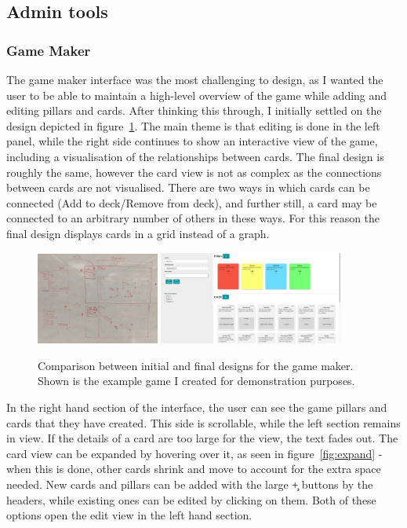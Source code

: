 \subsection{Admin tools}

\subsubsection{Game Maker}
The game maker interface was the most challenging to design, as I wanted the user to be able to maintain a high-level overview of the game while adding and editing pillars and cards.
After thinking this through, I initially settled on the design depicted in figure~\ref{fig:game_maker}. The main theme is that editing is done in the left panel, while the right side continues to show an interactive view of the game, including a visualisation of the relationships between cards.
The final design is roughly the same, however the card view is not as complex as the connections between cards are not visualised. 
There are two ways in which cards can be connected (Add to deck/Remove from deck), and further still, a card may be connected to an arbitrary number of others in these ways. For this reason the final design displays cards in a grid instead of a graph.

\begin{figure}[!h]
	\centering
	\includegraphics[width=0.36\textwidth]{./images/design/game_maker_drawing.png}
	\includegraphics[width=0.54\textwidth]{./images/design/game_maker.png}
	\caption{Comparison between initial and final designs for the game maker. Shown is the example game I created for demonstration purposes.}
	\label{fig:game_maker}
\end{figure}

In the right hand section of the interface, the user can see the game pillars and cards that they have created. This side is scrollable, while the left section remains in view. If the details of a card are too large for the view, the text fades out. The card view can be expanded by hovering over it, as seen in figure~\ref{fig:expand} - when this is done, other cards shrink and move to account for the extra space needed. New cards and pillars can be added with the large \c{+} buttons by the headers, while existing ones can be edited by clicking on them. Both of these options open the edit view in the left hand section.

